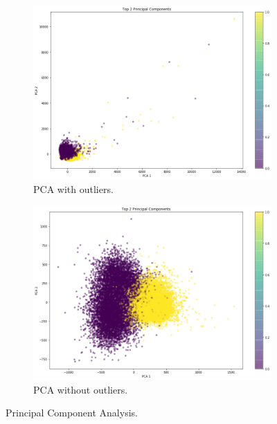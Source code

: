 \documentclass{article}
\begin{document}
\begin{figure}[H]
    \centering
    \begin{subfigure}{.49\textwidth}
      \centering
      \includegraphics[width=1\textwidth]{./img/PCA_outliers.png}
      \caption{PCA with outliers.}
      \label{fig:PCA_outliers}
    \end{subfigure}
    \begin{subfigure}{.49\textwidth}
        \centering
        \includegraphics[width=1\textwidth]{./img/PCA_no_outliers.png}
        \caption{PCA without outliers.}
        \label{fig:PCA_no_outliers}
    \end{subfigure}
    \caption{Principal Component Analysis.}
    \label{fig:PCA}
\end{figure}
\end{document}
